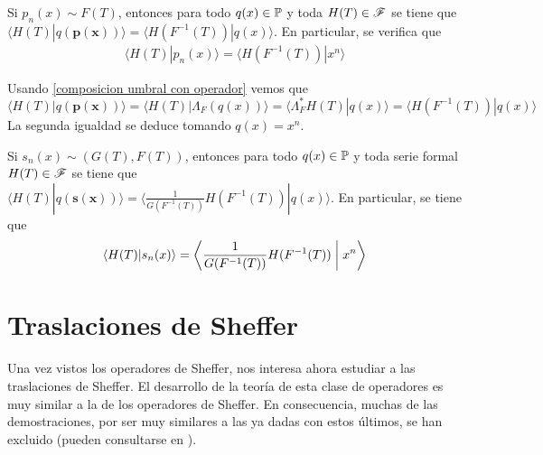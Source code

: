 \begin{teorema}
    Si $p_n(x) \sim F(T)$, entonces para todo $q(x) \in \mathbb{P}$ y toda $H(T) \in \mathscr{F}$ se tiene que $\langle H(T) | q(\mathbf{p(x)}) \rangle = \langle H(F^{-1}(T)) | q(x) \rangle $. En particular, se verifica que 
    \begin{align*}
        \langle H(T) | p_n(x) \rangle = \langle H(F^{-1}(T)) | x^n \rangle 
    \end{align*}
\end{teorema}

\begin{demo}
    Usando \eqref{composicion umbral con operador} vemos que
    \begin{equation*}
        \langle H(T) | q(\mathbf{p(x)}) \rangle = \langle H(T) |  \Lambda_{F}(q(x)) \rangle =  \langle \Lambda_{F}^*H(T) |  q(x) \rangle = \langle H(F^{-1}(T))| q(x) \rangle
    \end{equation*}
    La segunda igualdad se deduce tomando $q(x) = x^n$.
\end{demo}


\begin{corolario}
    Si $s_n(x) \sim (G(T), F(T))$, entonces para todo $q(x) \in \mathbb{P}$ y toda serie formal $H(T) \in \mathscr{F}$ se tiene que $ \langle H(T) | q(\mathbf{s(x)}) \rangle = \langle \frac{1}{G(F^{-1}(T))}H(F^{-1}(T)) | q(x) \rangle $. En particular,  se tiene que 
    \begin{align*}
        \langle H(T) | s_n(x) \rangle = \left\langle \frac{1}{G(F^{-1}(T))}H(F^{-1}(T)) \biggm| x^n \right\rangle
    \end{align*}
\end{corolario}



\section{Traslaciones de Sheffer}

Una vez vistos los operadores de Sheffer, nos interesa ahora estudiar a las traslaciones de Sheffer. El desarrollo de la teoría de esta clase de operadores es muy similar a la de los operadores de Sheffer. En consecuencia, muchas de las demostraciones, por ser muy similares a las ya dadas con estos últimos, se han excluido (pueden consultarse en \cite{roman2}).

